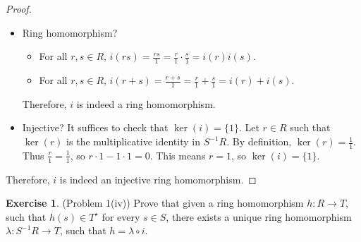 \documentclass[12pt, psamsfonts]{amsart}
\theoremstyle{definition}
\newtheorem*{exer}{Exercise}
\theoremstyle{remark}
\numberwithin{equation}{section}
\begin{document}
\begin{proof}
  $ $
  \begin{itemize}
    \item
      Ring homomorphism?
      \begin{itemize}
        \item
          For all $r, s \in R$, $i(rs) = \frac{rs}{1} = \frac{r}{1} \cdot \frac{s}{1} = i(r)i(s)$.
        \item
          For all $r, s \in R$, $i(r + s) = \frac{r + s}{1} = \frac{r}{1} + \frac{s}{1} = i(r) + i(s)$.
      \end{itemize}
      Therefore, $i$ is indeed a ring homomorphism.
    \item
      Injective?
      It suffices to check that $\ker(i) = \{ 1 \}$.
      Let $r \in R$ such that $\ker(r)$ is the multiplicative identity in $S^{-1}R$.
      By definition, $\ker(r) = \frac{1}{1}$.
      Thus $\frac{r}{1} = \frac{1}{1}$, so $r \cdot 1 - 1 \cdot 1 = 0$.
      This means $r = 1$, so $\ker(i) = \{ 1 \}$.
  \end{itemize}
  Therefore, $i$ is indeed an injective ring homomorphism.
\end{proof}

\begin{exer}{(Problem 1(iv))}
  Prove that given a ring homomorphism $h: R \rightarrow T$, such that $h(s) \in T^{\star}$ for every $s \in S$, there exists a unique ring homomorphism $\lambda: S^{-1}R \rightarrow T$, such that $h = \lambda \circ i$.
\end{exer}
\end{document}
